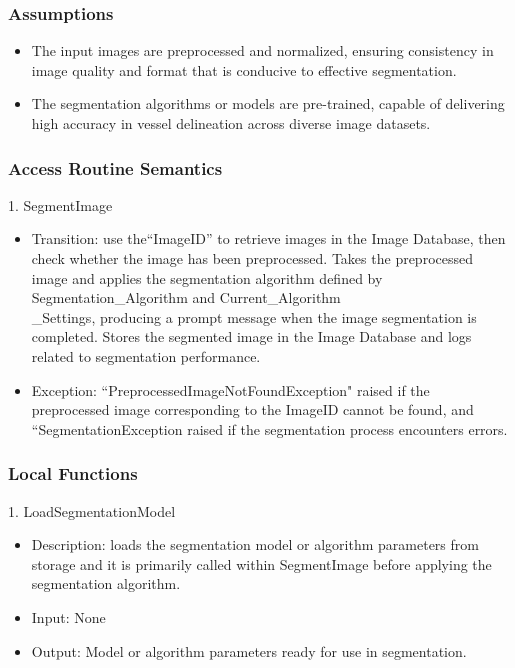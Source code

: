 \documentclass[12pt, titlepage]{article}
\begin{document}
\begin{itemize}
\subsubsection{Assumptions}
\begin{itemize}
    \item The input images are preprocessed and normalized, ensuring consistency in image quality and format that is conducive to effective segmentation.
    \item The segmentation algorithms or models are pre-trained, capable of delivering high accuracy in vessel delineation across diverse image datasets.
\end{itemize}

\subsubsection{Access Routine Semantics}

1. SegmentImage
\begin{itemize}
\item Transition: use the``ImageID” to retrieve images in the Image Database, then check
whether the image has been preprocessed. Takes the preprocessed image and applies the segmentation algorithm defined by Segmentation\_Algorithm and Current\_Algorithm\\\_Settings, producing a prompt message when the image segmentation is completed. Stores the segmented image in the Image Database and logs related to segmentation performance.

\item Exception:  ``PreprocessedImageNotFoundException" raised if the preprocessed image corresponding to the ImageID cannot be found, and ``SegmentationException raised if the segmentation process encounters errors.
\end{itemize}

\end{itemize}

\subsubsection{Local Functions}
1. LoadSegmentationModel
\begin{itemize}
    \item Description: loads the segmentation model or algorithm parameters from storage and it is primarily called within SegmentImage before applying the segmentation algorithm.
    \item Input: None 
    \item Output: Model or algorithm parameters ready for use in segmentation.
\end{itemize}
\end{document}
